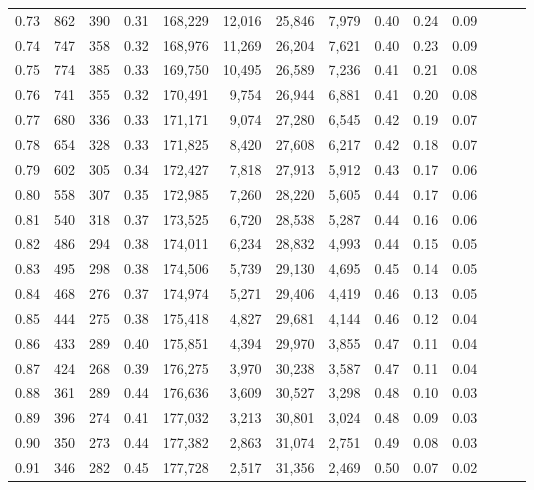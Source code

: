 \begin{tabular}{rrrrrrrrrrrrrr}
0.73 &    862 &  390 &  0.31 &  168,229 &   12,016 &  25,846 &   7,979 &  0.40 &  0.24 &      0.09 \\
0.74 &    747 &  358 &  0.32 &  168,976 &   11,269 &  26,204 &   7,621 &  0.40 &  0.23 &      0.09 \\
0.75 &    774 &  385 &  0.33 &  169,750 &   10,495 &  26,589 &   7,236 &  0.41 &  0.21 &      0.08 \\
0.76 &    741 &  355 &  0.32 &  170,491 &    9,754 &  26,944 &   6,881 &  0.41 &  0.20 &      0.08 \\
0.77 &    680 &  336 &  0.33 &  171,171 &    9,074 &  27,280 &   6,545 &  0.42 &  0.19 &      0.07 \\
0.78 &    654 &  328 &  0.33 &  171,825 &    8,420 &  27,608 &   6,217 &  0.42 &  0.18 &      0.07 \\
0.79 &    602 &  305 &  0.34 &  172,427 &    7,818 &  27,913 &   5,912 &  0.43 &  0.17 &      0.06 \\
0.80 &    558 &  307 &  0.35 &  172,985 &    7,260 &  28,220 &   5,605 &  0.44 &  0.17 &      0.06 \\
0.81 &    540 &  318 &  0.37 &  173,525 &    6,720 &  28,538 &   5,287 &  0.44 &  0.16 &      0.06 \\
0.82 &    486 &  294 &  0.38 &  174,011 &    6,234 &  28,832 &   4,993 &  0.44 &  0.15 &      0.05 \\
0.83 &    495 &  298 &  0.38 &  174,506 &    5,739 &  29,130 &   4,695 &  0.45 &  0.14 &      0.05 \\
0.84 &    468 &  276 &  0.37 &  174,974 &    5,271 &  29,406 &   4,419 &  0.46 &  0.13 &      0.05 \\
0.85 &    444 &  275 &  0.38 &  175,418 &    4,827 &  29,681 &   4,144 &  0.46 &  0.12 &      0.04 \\
0.86 &    433 &  289 &  0.40 &  175,851 &    4,394 &  29,970 &   3,855 &  0.47 &  0.11 &      0.04 \\
0.87 &    424 &  268 &  0.39 &  176,275 &    3,970 &  30,238 &   3,587 &  0.47 &  0.11 &      0.04 \\
0.88 &    361 &  289 &  0.44 &  176,636 &    3,609 &  30,527 &   3,298 &  0.48 &  0.10 &      0.03 \\
0.89 &    396 &  274 &  0.41 &  177,032 &    3,213 &  30,801 &   3,024 &  0.48 &  0.09 &      0.03 \\
0.90 &    350 &  273 &  0.44 &  177,382 &    2,863 &  31,074 &   2,751 &  0.49 &  0.08 &      0.03 \\
0.91 &    346 &  282 &  0.45 &  177,728 &    2,517 &  31,356 &   2,469 &  0.50 &  0.07 &      0.02 \\

\end{tabular}
